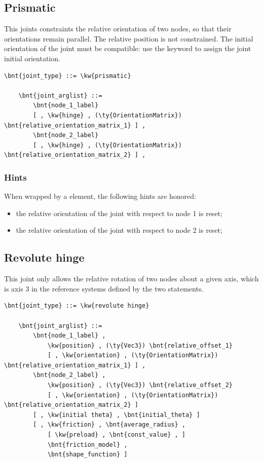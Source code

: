 \subsection{Prismatic}
This joints constraints the relative orientation of two nodes, so that
their orientations remain parallel.
The relative position is not constrained.
The initial orientation of the joint must be
compatible: use the  keyword to assign 
the joint initial orientation.
\begin{Verbatim}[commandchars=\\\{\}]
    \bnt{joint_type} ::= \kw{prismatic}

    \bnt{joint_arglist} ::= 
        \bnt{node_1_label}
        [ , \kw{hinge} , (\ty{OrientationMatrix}) \bnt{relative_orientation_matrix_1} ] ,
        \bnt{node_2_label}
        [ , \kw{hinge} , (\ty{OrientationMatrix}) \bnt{relative_orientation_matrix_2} ] ,
\end{Verbatim}

\subsubsection{Hints}
When wrapped by a  element, the following hints are honored:
\begin{itemize}
\item {} the relative orientation of the joint
with respect to node 1 is reset;
\item {} the relative orientation of the joint
with respect to node 2 is reset;
\end{itemize}

\subsection{Revolute hinge}
\label{sec:EL:STRUCT:JOINT:REVOLUTE_HINGE}
This joint only allows the relative rotation of two nodes about
a given axis, which is axis 3 in the reference systems defined 
by the two  statements.
\begin{Verbatim}[commandchars=\\\{\}]
    \bnt{joint_type} ::= \kw{revolute hinge}

    \bnt{joint_arglist} ::= 
        \bnt{node_1_label} ,
            \kw{position} , (\ty{Vec3}) \bnt{relative_offset_1}
            [ , \kw{orientation} , (\ty{OrientationMatrix}) \bnt{relative_orientation_matrix_1} ] ,
        \bnt{node_2_label} ,
            \kw{position} , (\ty{Vec3}) \bnt{relative_offset_2}
            [ , \kw{orientation} , (\ty{OrientationMatrix}) \bnt{relative_orientation_matrix_2} ]
        [ , \kw{initial theta} , \bnt{initial_theta} ]
        [ , \kw{friction} , \bnt{average_radius} , 
            [ \kw{preload} , \bnt{const_value} , ]
            \bnt{friction_model} , 
            \bnt{shape_function} ]
\end{Verbatim}

